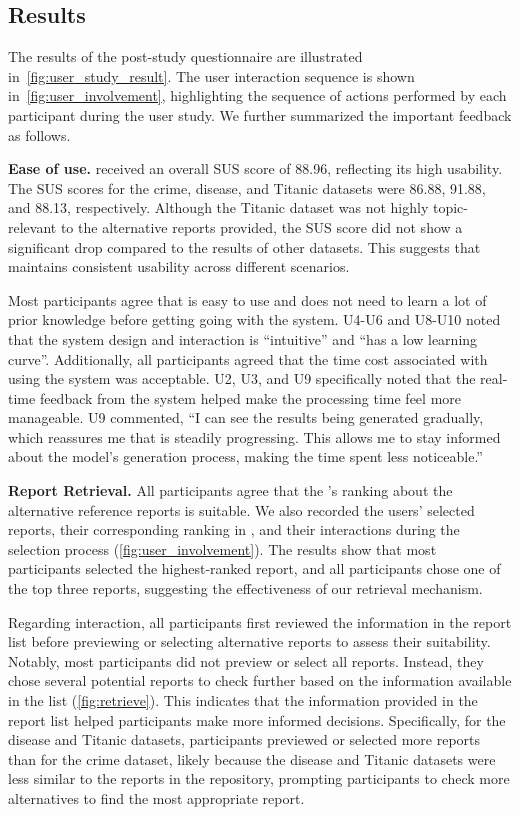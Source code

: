 \subsection{Results}

The results of the post-study questionnaire are illustrated in~\autoref{fig:user_study_result}.
The user interaction sequence is shown in~\autoref{fig:user_involvement}, highlighting the sequence of actions performed by each participant during the user study. 
We further summarized the important feedback as follows. 

\textbf{Ease of use. }\system{} received an overall SUS score of 88.96, reflecting its high usability. 
The SUS scores for the crime, disease, and Titanic datasets were 86.88, 91.88, and 88.13, respectively. 
Although the Titanic dataset was not highly topic-relevant to the alternative reports provided, the SUS score did not show a significant drop compared to the results of other datasets. 
This suggests that \system{} maintains consistent usability across different scenarios. 

Most participants agree that \system{} is easy to use and does not need to learn a lot of prior knowledge before getting going with the system. 
U4-U6 and U8-U10 noted that the system design and interaction is ``intuitive'' and ``has a low learning curve''. 
Additionally, all participants agreed that the time cost associated with using the system was acceptable. 
U2, U3, and U9 specifically noted that the real-time feedback from the system helped make the processing time feel more manageable.
U9 commented, ``I can see the results being generated gradually, which reassures me that \system{} is steadily progressing. This allows me to stay informed about the model's generation process, making the time spent less noticeable.''

\textbf{Report Retrieval. }
All participants agree that the \system{}'s ranking about the alternative reference reports is suitable. 
We also recorded the users' selected reports, their corresponding ranking in \system{}, and their interactions during the selection process (\autoref{fig:user_involvement}).
The results show that most participants selected the highest-ranked report, and all participants chose one of the top three reports, suggesting the effectiveness of our retrieval mechanism.

Regarding interaction, all participants first reviewed the information in the report list before previewing or selecting alternative reports to assess their suitability.
Notably, most participants did not preview or select all reports. 
Instead, they chose several potential reports to check further based on the information available in the list (\autoref{fig:retrieve}). 
This indicates that the information provided in the report list helped participants make more informed decisions.
Specifically, for the disease and Titanic datasets, participants previewed or selected more reports than for the crime dataset, likely because the disease and Titanic datasets were less similar to the reports in the repository, prompting participants to check more alternatives to find the most appropriate report.

